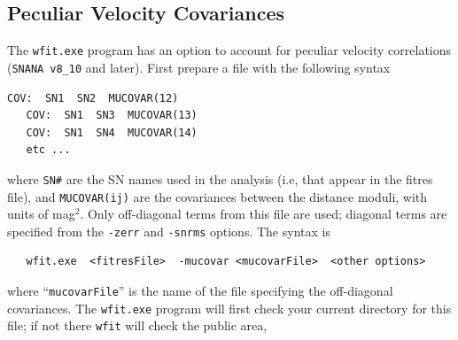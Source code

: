 \documentclass[12pt]{article}
\newcommand{\snana}{{\tt SNANA}}
\begin{document}
   \clearpage
   \subsection{Peculiar Velocity Covariances}
   \label{subsec:mucovar}


\newcommand{\Vinv}{V_{ij}^{-1}}

The {\tt wfit.exe} program has an option to account
for peculiar velocity correlations
(\snana\ {\tt v8\_10} and later).
First prepare a file with the following syntax
%
\begin{Verbatim}[frame=single]
   COV:  SN1  SN2  MUCOVAR(12)
   COV:  SN1  SN3  MUCOVAR(13)
   COV:  SN1  SN4  MUCOVAR(14)
   etc ...
\end{Verbatim}
%
where {\tt SN\#} are the SN names
used in the analysis (i.e, that appear in the fitres file),
and {\tt MUCOVAR(ij)} are the covariances between the
distance moduli, with units of mag$^2$.
Only off-diagonal terms from this file are used;
diagonal terms are specified from the 
{\tt -zerr} and {\tt -snrms} options.
The syntax is
\begin{verbatim}
   wfit.exe  <fitresFile>  -mucovar <mucovarFile>  <other options>
\end{verbatim}
%
where ``{\tt mucovarFile}'' is the name of the file
specifying the off-diagonal covariances.
The {\tt wfit.exe} program will first check
your current directory for this file; 
if not there {\tt wfit} will check the public area,
\end{document}
